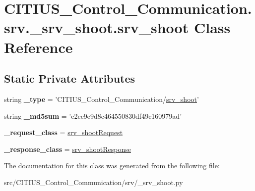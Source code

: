 \hypertarget{class_c_i_t_i_u_s___control___communication_1_1srv_1_1__srv__shoot_1_1srv__shoot}{\section{\-C\-I\-T\-I\-U\-S\-\_\-\-Control\-\_\-\-Communication.\-srv.\-\_\-srv\-\_\-shoot.\-srv\-\_\-shoot \-Class \-Reference}
\label{class_c_i_t_i_u_s___control___communication_1_1srv_1_1__srv__shoot_1_1srv__shoot}
}
\subsection*{\-Static \-Private \-Attributes}
\begin{DoxyCompactItemize}
\item 
\hypertarget{class_c_i_t_i_u_s___control___communication_1_1srv_1_1__srv__shoot_1_1srv__shoot_ab68b964dee08219101aa678c20af8f0f}{string {\bfseries \-\_\-type} = '\-C\-I\-T\-I\-U\-S\-\_\-\-Control\-\_\-\-Communication/\hyperlink{class_c_i_t_i_u_s___control___communication_1_1srv_1_1__srv__shoot_1_1srv__shoot}{srv\-\_\-shoot}'}\label{class_c_i_t_i_u_s___control___communication_1_1srv_1_1__srv__shoot_1_1srv__shoot_ab68b964dee08219101aa678c20af8f0f}

\item 
\hypertarget{class_c_i_t_i_u_s___control___communication_1_1srv_1_1__srv__shoot_1_1srv__shoot_ad27d70abd5101c436af3e9fa47fdd898}{string {\bfseries \-\_\-md5sum} = 'e2cc9e9d8c464550830df49c160979ad'}\label{class_c_i_t_i_u_s___control___communication_1_1srv_1_1__srv__shoot_1_1srv__shoot_ad27d70abd5101c436af3e9fa47fdd898}

\item 
\hypertarget{class_c_i_t_i_u_s___control___communication_1_1srv_1_1__srv__shoot_1_1srv__shoot_a6d737fe5dae0dfe7a7b7b0eaf6a4e6a2}{{\bfseries \-\_\-request\-\_\-class} = \hyperlink{class_c_i_t_i_u_s___control___communication_1_1srv_1_1__srv__shoot_1_1srv__shoot_request}{srv\-\_\-shoot\-Request}}\label{class_c_i_t_i_u_s___control___communication_1_1srv_1_1__srv__shoot_1_1srv__shoot_a6d737fe5dae0dfe7a7b7b0eaf6a4e6a2}

\item 
\hypertarget{class_c_i_t_i_u_s___control___communication_1_1srv_1_1__srv__shoot_1_1srv__shoot_a0ec90c237c7d2861b1a8d9504854f5fa}{{\bfseries \-\_\-response\-\_\-class} = \hyperlink{class_c_i_t_i_u_s___control___communication_1_1srv_1_1__srv__shoot_1_1srv__shoot_response}{srv\-\_\-shoot\-Response}}\label{class_c_i_t_i_u_s___control___communication_1_1srv_1_1__srv__shoot_1_1srv__shoot_a0ec90c237c7d2861b1a8d9504854f5fa}

\end{DoxyCompactItemize}


\-The documentation for this class was generated from the following file\-:\begin{DoxyCompactItemize}
\item 
src/\-C\-I\-T\-I\-U\-S\-\_\-\-Control\-\_\-\-Communication/srv/\-\_\-srv\-\_\-shoot.\-py\end{DoxyCompactItemize}

